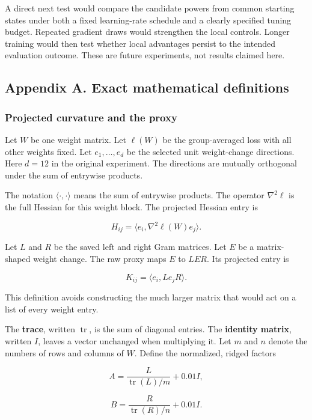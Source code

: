 \documentclass[
  14pt,
  letterpaper,
]{extarticle}
\begin{document}
A direct next test would compare the candidate powers from common
starting states under both a fixed learning-rate schedule and a clearly
specified tuning budget. Repeated gradient draws would strengthen the
local controls. Longer training would then test whether local advantages
persist to the intended evaluation outcome. These are future
experiments, not results claimed here.

\subsection{Appendix A. Exact mathematical
definitions}\label{appendix-a.-exact-mathematical-definitions}

\subsubsection{Projected curvature and the
proxy}\label{projected-curvature-and-the-proxy}

Let \(W\) be one weight matrix. Let \(\ell(W)\) be the group-averaged
loss with all other weights fixed. Let \(e_1,\ldots,e_d\) be the
selected unit weight-change directions. Here \(d=12\) in the original
experiment. The directions are mutually orthogonal under the sum of
entrywise products.

The notation \(\langle\cdot,\cdot\rangle\) means the sum of entrywise
products. The operator \(\nabla^2\ell\) is the full Hessian for this
weight block. The projected Hessian entry is

\[H_{ij}=\langle e_i,\nabla^2\ell(W)e_j\rangle.\]

Let \(L\) and \(R\) be the saved left and right Gram matrices. Let \(E\)
be a matrix-shaped weight change. The raw proxy maps \(E\) to \(LER\).
Its projected entry is

\[K_{ij}=\langle e_i,Le_jR\rangle.\]

This definition avoids constructing the much larger matrix that would
act on a list of every weight entry.

The \textbf{trace}, written \(\operatorname{tr}\), is the sum of
diagonal entries. The \textbf{identity matrix}, written \(I\), leaves a
vector unchanged when multiplying it. Let \(m\) and \(n\) denote the
numbers of rows and columns of \(W\). Define the normalized, ridged
factors

\[A=\frac{L}{\operatorname{tr}(L)/m}+0.01I,\]

\[B=\frac{R}{\operatorname{tr}(R)/n}+0.01I.\]
\end{document}

